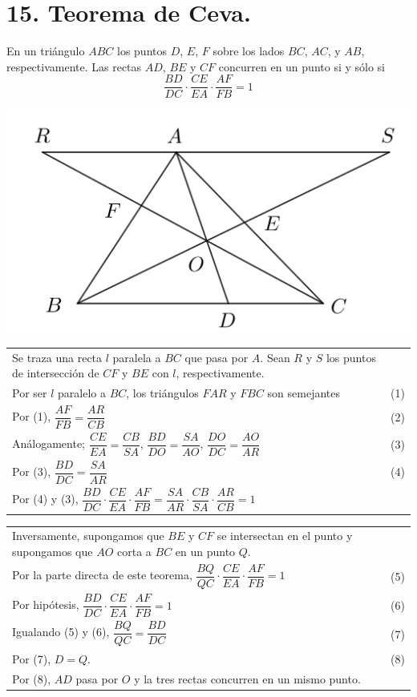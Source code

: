 \documentclass[12pt,a4paper, oneside]{book}
\begin{document}
\section{15. Teorema de Ceva.}
En un triángulo $ABC$ los puntos $D$, $E$, $F$ sobre los lados $BC$, $AC$, y $AB$, respectivamente. Las rectas $AD$, $BE$ y $CF$ concurren en un punto si y sólo si
$$\dfrac{BD}{DC}\cdot\dfrac{CE}{EA}\cdot\dfrac{AF}{FB}=1$$
\begin{center}
\includegraphics[scale=0.8]{Imagenes/Ceva.png} 
\end{center}
\begin{tabular}{p{15.9 cm} p{1cm}}
\\
Se traza una recta $l$ paralela a $BC$ que pasa por $A$. Sean $R$ y $S$ los puntos de intersección de $CF$ y $BE$ con $l$, respectivamente.
\\Por ser $l$ paralelo a $BC$, los triángulos $FAR$ y $FBC$ son semejantes& (1)
\\Por (1), $\dfrac{AF}{FB}=\dfrac{AR}{CB}$&(2) 
\\Análogamente; $\dfrac{CE}{EA}=\dfrac{CB}{SA}$, $\dfrac{BD}{DO}=\dfrac{SA}{AO}$, $\dfrac{DO}{DC}=\dfrac{AO}{AR}$&(3)
\\Por (3), $\dfrac{BD}{DC}=\dfrac{SA}{AR}$&(4)
\\Por (4) y (3), $\dfrac{BD}{DC}\cdot \dfrac{CE}{EA}\cdot \dfrac{AF}{FB}=\dfrac{SA}{AR}\cdot \dfrac{CB}{SA}\cdot \dfrac{AR}{CB}=1$
\end{tabular}
\begin{tabular}{p{15.9 cm} p{1cm}}
\\Inversamente, supongamos que $BE$ y $CF$ se intersectan en el punto y supongamos que $AO$ corta a $BC$ en un punto $Q$. 
\\Por la parte directa de este teorema, $\dfrac{BQ}{QC}\cdot\dfrac{CE}{EA}\cdot\dfrac{AF}{FB}=1$ &(5)
\\Por hipótesis, $\dfrac{BD}{DC}\cdot\dfrac{CE}{EA}\cdot\dfrac{AF}{FB}=1$&(6)
\\Igualando (5) y (6), $\dfrac{BQ}{QC}=\dfrac{BD}{DC}$ &(7)
\\Por (7), $D=Q.$ &(8) 
\\Por (8), $AD$ pasa por $O$ y la tres rectas concurren en un mismo punto.
\end{tabular}
\end{document}
